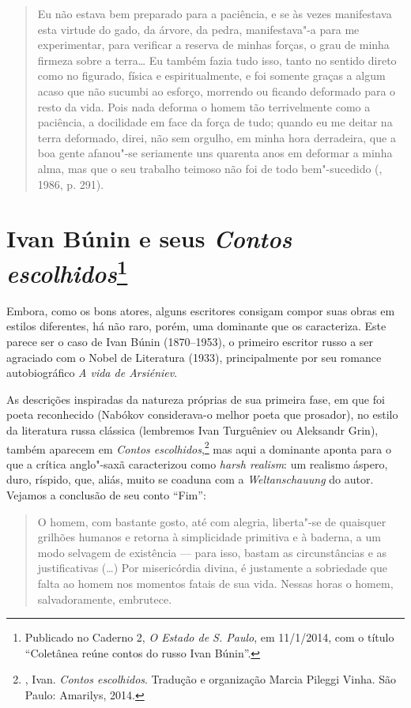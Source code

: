 \begin{quotation}
Eu não estava bem preparado para a paciência, e se às vezes manifestava esta virtude do gado, da árvore, da pedra, manifestava"-a para me experimentar, para verificar a reserva de minhas forças, o grau de minha firmeza sobre a terra\ldots{} Eu também fazia tudo isso, tanto no sentido direto como no figurado, física e espiritualmente, e foi somente graças a algum acaso que não sucumbi ao esforço, morrendo ou ficando deformado para o resto da vida. Pois nada deforma o homem tão terrivelmente como a paciência, a docilidade em face da força de tudo; quando eu me deitar na terra deformado, direi, não sem orgulho, em minha hora derradeira, que a boa gente afanou"-se seriamente uns quarenta anos em deformar a minha alma, mas que o seu trabalho teimoso não foi de todo bem"-sucedido (, 1986, p. 291).
\end{quotation}

\chapter{Ivan Búnin e seus \emph{Contos escolhidos}\footnote{Publicado no Caderno 2, \emph{O Estado de S. Paulo}, em 11/1/2014, com o título ``Coletânea reúne contos do russo Ivan Búnin''.}}
\label{bunin}

Embora, como os bons atores, alguns escritores consigam compor
suas obras em estilos diferentes, há não raro, porém, uma dominante
que os caracteriza. Este parece ser o caso de Ivan Búnin
(1870--1953), o primeiro escritor russo a ser agraciado com o
Nobel de Literatura (1933), principalmente por seu romance
autobiográfico \emph{A vida de Arsiéniev}.

As descrições inspiradas da natureza próprias de sua primeira
fase, em que foi poeta reconhecido (Nabókov considerava-o melhor
poeta que prosador), no estilo da literatura russa clássica
(lembremos Ivan Turguêniev ou Aleksandr Grin), também aparecem
em \emph{Contos escolhidos},\footnote{, Ivan.
\emph{Contos escolhidos}. Tradução e organização Marcia Pileggi Vinha. São
Paulo: Amarilys, 2014.} mas aqui a dominante aponta para o que
a crítica anglo"-saxã caracterizou como \emph{harsh realism}:
um realismo áspero, duro, ríspido, que, aliás, muito se coaduna
com a \emph{Weltanschauung} do autor. Vejamos a conclusão de
seu conto ``Fim'': 

\begin{quotation}
O homem, com bastante gosto, até com alegria, liberta"-se de
quaisquer grilhões humanos e retorna à simplicidade primitiva e
à baderna, a um modo selvagem de existência --- para isso, bastam
as circunstâncias e as justificativas (\ldots{}) Por misericórdia
divina, é justamente a sobriedade que falta ao homem nos momentos
fatais de sua vida. Nessas horas o homem, salvadoramente,
embrutece.
\end{quotation}

